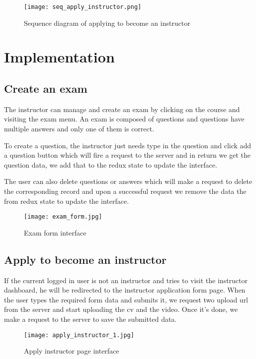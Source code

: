 \begin{figure}[!ht]
    \centering
    \texttt{[image: seq\_apply\_instructor.png]}
    \caption{Sequence diagram of applying to become an instructor}
    \label{fig:seq_apply_instructor}
\end{figure}



\section{Implementation}
\subsection{Create an exam}
The instructor can manage and create an exam by clicking on the course and visiting the exam menu. An exam is composed of questions and questions have multiple answers and only one of them is correct.

To create a question, the instructor just needs type in the question and click add a question button which will fire a request to the server and in return we get the question data, we add that to the redux state to update the interface.

The user can also delete questions or answers which will make a request to delete the corresponding record and upon a successful request we remove the data the from redux state to update the interface.

\begin{figure}[!ht]
    \centering
    \texttt{[image: exam\_form.jpg]}
    \caption{Exam form interface}
    \label{fig:exam_form}
\end{figure}

\subsection{Apply to become an instructor}
If the current logged in user is not an instructor and tries to visit the instructor dashboard, he will be redirected to the instructor application form page.
When the user types the required form data and submits it, we request two upload url from the server and start uploading the cv and the video. Once it's done, we make a request to the server to save the submitted data.
\hfill \break
\hfill \break

\vfill
\clearpage

\begin{figure}[!ht]
    \centering
    \texttt{[image: apply\_instructor\_1.jpg]}
    \caption{Apply instructor page interface}
    \label{fig:apply_instructor_1}
\end{figure}


